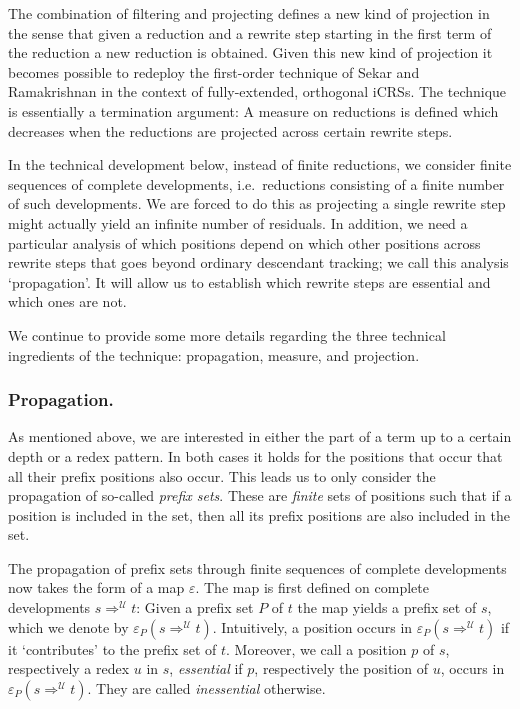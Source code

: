 \documentclass{LMCS}
\theoremstyle{definition}
\newcommand{\dev}{\Rightarrow}
\newcommand{\pmap}{\varepsilon}
\newcommand{\pmapp}[2]{\pmap_{#1}({#2})}
\begin{document}
The combination of filtering and projecting defines a new kind of projection in the sense that given a reduction and a rewrite step starting in the first term of the reduction a new reduction is obtained. Given this new kind of projection it becomes possible to redeploy the first-order technique of Sekar and Ramakrishnan \cite{SR90} in the context of fully-extended, orthogonal iCRSs. The technique is essentially a termination argument: A measure on reductions is defined which decreases when the reductions are projected across certain rewrite steps.

In the technical development below, instead of finite reductions, we consider finite sequences of complete developments, i.e.\ reductions consisting of a finite number of such developments. We are forced to do this as projecting a single rewrite step might actually yield an infinite number of residuals. In addition, we need a particular analysis of which positions depend on which other positions across rewrite steps that goes beyond ordinary descendant tracking; we call this analysis `propagation'. It will allow us to establish which rewrite steps are essential and which ones are not.

We continue to provide some more details regarding the three technical ingredients of the technique: propagation, measure, and projection. 

\subsubsection*{Propagation.}

As mentioned above, we are interested in either the part of a term up to a certain depth or a redex pattern. In both cases it holds for the positions that occur that all their prefix positions also occur. This leads us to only consider the propagation of so-called \emph{prefix sets}. These are \emph{finite} sets of positions such that if a position is included in the set, then all its prefix positions are also included in the set.

The propagation of prefix sets through finite sequences of complete developments now takes the form of a map $\pmap$. The map is first defined on complete developments $s \dev^\mathcal{U} t$: Given a prefix set $P$ of $t$ the map yields a prefix set of $s$, which we denote by $\pmapp{P}{s \dev^\mathcal{U} t}$. Intuitively, a position occurs in $\pmapp{P}{s \dev^\mathcal{U} t}$ if it `contributes' to the prefix set of $t$. Moreover, we call a position $p$ of $s$, respectively a redex $u$ in $s$, \emph{essential} if $p$, respectively the position of $u$, occurs in $\pmapp{P}{s \dev^\mathcal{U} t}$. They are called \emph{inessential} otherwise.
\end{document}
